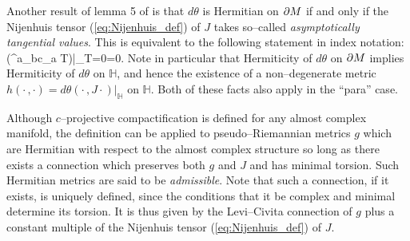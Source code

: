 Another result of lemma 5 of \cite{CG} is that $d\theta$ is Hermitian on $\partial M$ if and only if the Nijenhuis tensor (\ref{eq:Nijenhuis_def}) of $J$ takes so--called \textit{asymptotically tangential values}. This is equivalent to the following statement in index notation:
\be
\label{Nijenhuis_condition}
\Big({^{a}}_{bc}\nabla_a T\Big)\Big|_{T=0}=0.  \ee
Note in particular that Hermiticity of $d\theta$ on $\partial M$ implies Hermiticity of $d\theta$ on $ \mathbb{H} $, and hence the existence of a non--degenerate metric $h(\cdot\,,\cdot)=d\theta(\cdot\,,J\cdot)|_ \mathbb{H} $ on $ \mathbb{H} $. Both of these facts also apply in the ``para'' case.


Although $c$--projective compactification is defined for any almost complex manifold, the definition can be applied to pseudo--Riemannian metrics $g$ which are Hermitian with respect to the almost complex structure so long as there exists a connection which preserves both $g$ and $J$ and has minimal torsion. Such Hermitian metrics are said to be \textit{admissible}.  Note that such a connection, if it exists, is uniquely defined, since the conditions that it be complex and minimal determine its torsion. It is thus given by the Levi--Civita connection of $g$ plus a constant multiple of the Nijenhuis tensor (\ref{eq:Nijenhuis_def}) of $J$.

